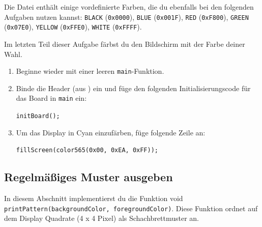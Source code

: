 Die Datei  enthält einige vordefinierte Farben, die du ebenfalls bei den folgenden Aufgaben nutzen kannst: 
\lstinline|BLACK| (\lstinline|0x0000|), \lstinline|BLUE| (\lstinline|0x001F|), \lstinline|RED| (\lstinline|0xF800|), 
\lstinline|GREEN| (\lstinline|0x07E0|), \lstinline|YELLOW| (\lstinline|0xFFE0|), \lstinline|WHITE| (\lstinline|0xFFFF|).

Im letzten Teil dieser Aufgabe färbst du den Bildschirm mit der Farbe deiner Wahl.
\begin{enumerate}
\item 
Beginne wieder mit einer leeren \lstinline|main|-Funktion.
\item 
Binde die Header  (aus ) ein und füge den folgenden Initialisierungscode für das Board in \lstinline|main| ein:

\lstinline|initBoard();|

\item 
Um das Display in Cyan einzufärben, füge folgende Zeile an:

\lstinline|fillScreen(color565(0x00, 0xEA, 0xFF));|
\end{enumerate}


\subsection{Regelmäßiges Muster ausgeben}
In diesem Abschnitt implementierst du die Funktion void \lstinline|printPattern(backgroundColor, foregroundColor)|.
Diese Funktion ordnet auf dem Display Quadrate (4 x 4 Pixel) als Schachbrettmuster an.
%


